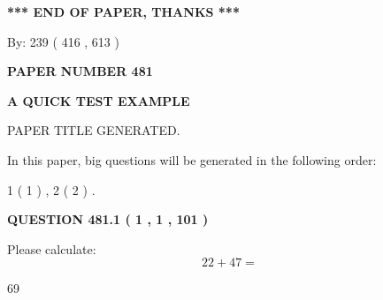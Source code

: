 \documentclass[12pt]{article}
\begin{document}
   
   
   
\vspace{1.0in} 
{\textbf{\large{ *** END OF PAPER, THANKS *** }}} 
   
   
\hspace{1.0in} By: 
 239 ( 416 ,  613 )
   
   
   
   
\newpage 
\setcounter{page}{ 
   481001 } 
   
   
   
   
 {\textbf{ \Large{ PAPER NUMBER  481  }}}
   
   
\vspace{0.2in}
   
   
   
   
   
   
   
   
 \vspace{0.2in}
{\LARGE {\textbf{ A QUICK TEST EXAMPLE}}}
   
   
 PAPER TITLE GENERATED.
   
   
   
\vspace{0.2in}
   
In this paper, big questions will be generated in the following order: 
   
   
   1 ( 1 )
 ,
   2 ( 2 )
 .
  
\vspace{0.2in}
  
{\textbf{\Large{QUESTION
481.1 
 ( 1 , 1 , 101 )
}}}
  
  
 
Please calculate:
\begin{equation}
22 +  %
47 = \nonumber
\end{equation}
 
 
 
\noindent{}
 
 

69
 
 
\noindent{}
 
 

 
 
 
\noindent{}
 
\end{document}

